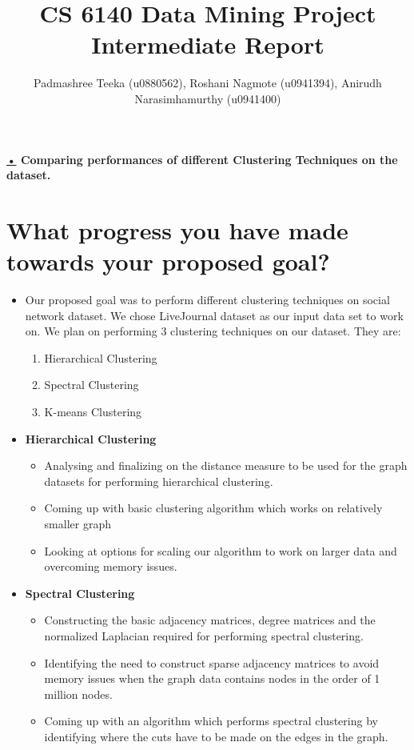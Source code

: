 \documentclass[11pt]{exam}
\title{CS 6140 Data Mining Project Intermediate Report}
\author{Padmashree Teeka (u0880562), Roshani Nagmote (u0941394), Anirudh Narasimhamurthy (u0941400)}
\begin{document}
\maketitle

\textbf{\underline{•} Comparing performances of different Clustering Techniques on the dataset.}

%
%

\section{What progress you have made towards your proposed goal?}

\begin{itemize}
	
 \item[] Our proposed goal was to perform different clustering techniques on social network dataset. We chose LiveJournal dataset as our input data set to work on. We plan on performing 3 clustering techniques on our dataset. They are: 
\begin{enumerate}
	
\item  Hierarchical Clustering
\item  Spectral Clustering
\item  K-means Clustering 

\end{enumerate}

\item \textbf{Hierarchical Clustering}
\begin{itemize}
\item  Analysing and finalizing on the distance measure to be used for the graph datasets for performing hierarchical clustering.
\item Coming up with basic clustering algorithm which works on relatively smaller graph
\item Looking at options for scaling our algorithm to work on larger data and overcoming memory issues.
\end{itemize}

\item \textbf{Spectral Clustering}

\begin{itemize}

\item Constructing the basic adjacency matrices, degree matrices and the normalized Laplacian required for performing spectral clustering.
\item Identifying the need to construct sparse adjacency matrices to avoid memory issues when the graph data contains nodes in the order of 1 million nodes.
\item Coming up with an algorithm which performs spectral clustering by identifying where the cuts have to be made on the edges in the graph.


\end{itemize}
\end{itemize}
\end{document}
